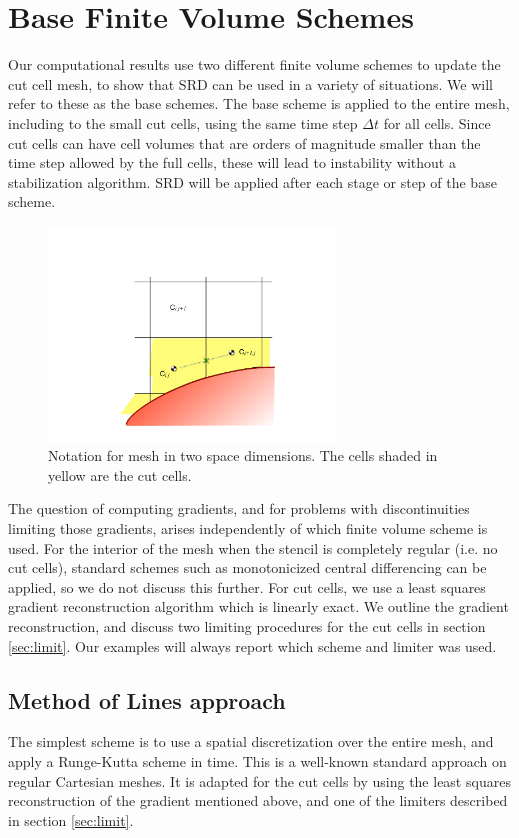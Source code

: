 \section{Base Finite Volume Schemes}\label{sec:basefv}

Our computational results use two different finite volume schemes
to update the cut cell mesh, to show that SRD can be used in a
variety of situations.
We will refer to these as the base schemes. 
The  base scheme is applied to the entire mesh, including  
to the small cut cells, using the same time step $\Delta t$ for all cells.  
Since cut cells can have cell volumes that are
orders of magnitude smaller than the time step allowed by the full
cells, these will lead to instability without a stabilization algorithm.
SRD will be applied after each stage or step of the base scheme.

\begin{figure}
\begin{center}
\includegraphics[width=3.0in]{figs/2dfig.pdf}
\caption{\sf Notation for mesh in two space dimensions. The cells shaded
in yellow are the cut cells.} 
\label{fig:2dfig}
\end{center}
\end{figure}

The question of computing gradients, and for problems with discontinuities limiting
those gradients, arises independently of which finite volume scheme is used. 
For the interior of the mesh when the stencil is completely regular (i.e. no cut
cells), standard schemes such as monotonicized central differencing can be 
applied, so we do not discuss this further.
For cut cells, we use a least squares gradient reconstruction algorithm which is
linearly exact.  We outline the gradient reconstruction, and
discuss two  limiting procedures for the cut cells in 
section \ref{sec:limit}. Our examples will always report which scheme and
limiter was used.


\subsection{Method of Lines approach}
The simplest scheme is to use a spatial discretization over the entire
mesh, and apply a Runge-Kutta scheme in time. This is a well-known
standard approach
on regular Cartesian meshes. It is adapted for the cut cells by
using the  least squares reconstruction of the gradient mentioned above, and one of
the limiters described in section \ref{sec:limit}.

